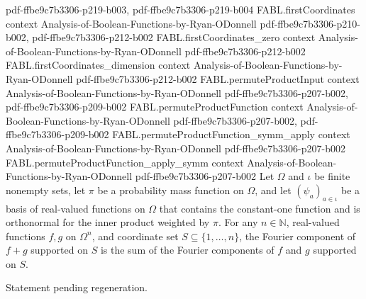 \begin{theorem}
  {pdf-ffbe9c7b3306-p219-b003,
    pdf-ffbe9c7b3306-p219-b004}
\proofstep
  {FABL.firstCoordinates}
  {context}
  {Analysis-of-Boolean-Functions-by-Ryan-ODonnell}
  {pdf-ffbe9c7b3306-p210-b002,
    pdf-ffbe9c7b3306-p212-b002}
\proofstep
  {FABL.firstCoordinates_zero}
  {context}
  {Analysis-of-Boolean-Functions-by-Ryan-ODonnell}
  {pdf-ffbe9c7b3306-p212-b002}
\proofstep
  {FABL.firstCoordinates_dimension}
  {context}
  {Analysis-of-Boolean-Functions-by-Ryan-ODonnell}
  {pdf-ffbe9c7b3306-p212-b002}
\proofstep
  {FABL.permuteProductInput}
  {context}
  {Analysis-of-Boolean-Functions-by-Ryan-ODonnell}
  {pdf-ffbe9c7b3306-p207-b002,
    pdf-ffbe9c7b3306-p209-b002}
\proofstep
  {FABL.permuteProductFunction}
  {context}
  {Analysis-of-Boolean-Functions-by-Ryan-ODonnell}
  {pdf-ffbe9c7b3306-p207-b002,
    pdf-ffbe9c7b3306-p209-b002}
\proofstep
  {FABL.permuteProductFunction_symm_apply}
  {context}
  {Analysis-of-Boolean-Functions-by-Ryan-ODonnell}
  {pdf-ffbe9c7b3306-p207-b002}
\proofstep
  {FABL.permuteProductFunction_apply_symm}
  {context}
  {Analysis-of-Boolean-Functions-by-Ryan-ODonnell}
  {pdf-ffbe9c7b3306-p207-b002}
Let $\Omega$ and $\iota$ be finite nonempty sets, let $\pi$ be a probability mass
function on $\Omega$, and let $(\psi_a)_{a\in\iota}$ be a basis of real-valued functions
on $\Omega$ that contains the constant-one function and is orthonormal for the inner
product weighted by $\pi$. For any $n\in\mathbb N$, real-valued functions $f,g$ on
$\Omega^n$, and coordinate set $S\subseteq\{1,\ldots,n\}$, the Fourier component of
$f+g$ supported on $S$ is the sum of the Fourier components of $f$ and $g$ supported on
$S$.
\end{theorem}

\begin{theorem}
\label{FABL.FiniteFourierBasis.orthogonalComponent_smul}
\leanok
{}
Statement pending regeneration.
\end{theorem}

